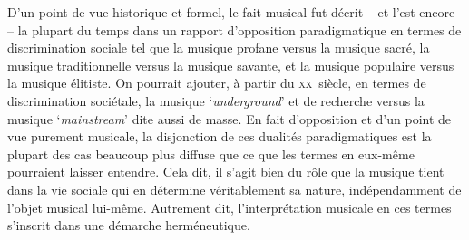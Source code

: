 \documentclass{article}
\begin{document}
D'un point de vue historique et formel, le fait musical fut décrit -- et l'est encore -- la plupart du temps dans un rapport  d'opposition paradigmatique en termes de discrimination sociale tel que la musique profane versus la musique sacré, la musique traditionnelle versus la musique savante, et la musique populaire versus la musique élitiste.
On pourrait ajouter, à partir du \textsc{xx}\ieme ~siècle, en termes de discrimination sociétale, la musique `\textit{underground}' et de recherche versus la musique `\textit{mainstream}' dite aussi de masse. %
En fait d’opposition et d’un point de vue purement musicale, la disjonction
de ces dualités paradigmatiques est la plupart des cas beaucoup plus diffuse que ce que les
termes en eux-même pourraient laisser entendre. Cela dit, il s’agit bien du rôle
que la musique tient dans la vie sociale qui en détermine véritablement sa nature,
indépendamment de l’objet musical lui-même. Autrement dit, l’interprétation
musicale en ces termes s’inscrit dans une démarche herméneutique.

\bigskip
\end{document}
